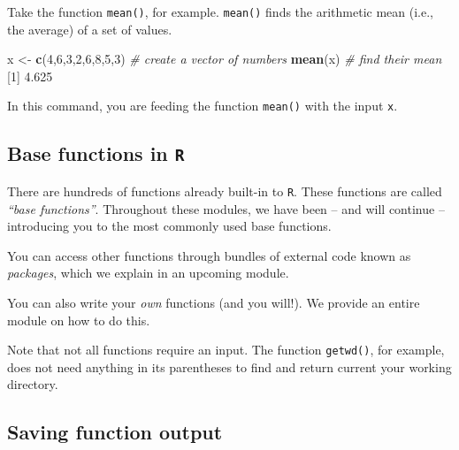 \documentclass[
]{book}
\newenvironment{Shaded}{\begin{snugshade}}{\end{snugshade}}
\newcommand{\CommentTok}[1]{\textcolor[rgb]{0.56,0.35,0.01}{\textit{#1}}}
\newcommand{\DecValTok}[1]{\textcolor[rgb]{0.00,0.00,0.81}{#1}}
\newcommand{\FloatTok}[1]{\textcolor[rgb]{0.00,0.00,0.81}{#1}}
\newcommand{\KeywordTok}[1]{\textcolor[rgb]{0.13,0.29,0.53}{\textbf{#1}}}
\newcommand{\NormalTok}[1]{#1}
\newcommand{\StringTok}[1]{\textcolor[rgb]{0.31,0.60,0.02}{#1}}
\begin{document}
Take the function \texttt{mean()}, for example. \texttt{mean()} finds the arithmetic mean (i.e., the average) of a set of values.

\begin{Shaded}
\begin{Highlighting}[]
\NormalTok{x <-}\StringTok{ }\KeywordTok{c}\NormalTok{(}\DecValTok{4}\NormalTok{,}\DecValTok{6}\NormalTok{,}\DecValTok{3}\NormalTok{,}\DecValTok{2}\NormalTok{,}\DecValTok{6}\NormalTok{,}\DecValTok{8}\NormalTok{,}\DecValTok{5}\NormalTok{,}\DecValTok{3}\NormalTok{) }\CommentTok{# create a vector of numbers}
\KeywordTok{mean}\NormalTok{(x) }\CommentTok{# find their mean}
\NormalTok{[}\DecValTok{1}\NormalTok{] }\FloatTok{4.625}
\end{Highlighting}
\end{Shaded}

In this command, you are feeding the function \texttt{mean()} with the input \texttt{x}.

\hypertarget{base-functions-in-r}{%
\subsection*{\texorpdfstring{Base functions in \texttt{R}}{Base functions in R}}\label{base-functions-in-r}}

There are hundreds of functions already built-in to \texttt{R}. These functions are called \emph{``base functions''}. Throughout these modules, we have been -- and will continue -- introducing you to the most commonly used base functions.

You can access other functions through bundles of external code known as \emph{packages}, which we explain in an upcoming module.

You can also write your \emph{own} functions (and you will!). We provide an entire module on how to do this.

Note that not all functions require an input. The function \texttt{getwd()}, for example, does not need anything in its parentheses to find and return current your working directory.

\hypertarget{saving-function-output}{%
\subsection*{Saving function output}\label{saving-function-output}}
\end{document}
